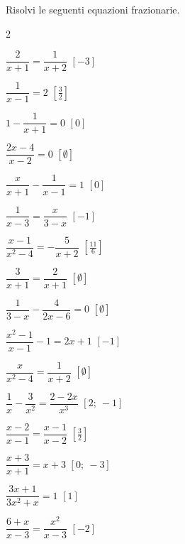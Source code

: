 \begin{esercizio}[*]
\label{ese:20.15}
Risolvi le seguenti equazioni frazionarie.
\begin{htmulticols}{2}
\begin{enumeratea}
 \item \(\dfrac{2}{x+1}=\dfrac{1}{x+2}\) \hfill \(\left[-3\right]\)
 \item \(\dfrac{1}{x-1}=2\) \hfill \(\left[\frac{3}{2}\right]\)
 \item \(1-\dfrac{1}{x+1}=0\) \hfill \(\left[0\right]\)
 \item \(\dfrac{2x-4}{x-2}=0\) \hfill \(\left[\emptyset\right]\)
 \item \(\dfrac{x}{x+1}-\dfrac{1}{x-1}=1\) \hfill \(\left[0\right]\)
 \item \(\dfrac{1}{x-3}=\dfrac{x}{3-x}\) \hfill \(\left[-1\right]\)
 \item \(\dfrac{x-1}{x^{2}-4}=-{\dfrac{5}{x+2}}\) 
  \hfill \(\left[\frac{11}{6}\right]\)
 \item \(\dfrac{3}{x+1}=\dfrac{2}{x+1}\) \hfill \(\left[\emptyset\right]\)
 \item \(\dfrac{1}{3-x}-\dfrac{4}{2x-6}=0\) \hfill \(\left[\emptyset\right]\)
 \item \(\dfrac{x^{2}-1}{x-1}-1=2x+1\) \hfill \(\left[-1\right]\)
 \item \(\dfrac{x}{x^{2}-4}=\dfrac{1}{x+2}\) \hfill \(\left[\emptyset\right]\)
 \item \(\dfrac{1}{x}-\dfrac{3}{x^{2}}=\dfrac{2-2x}{x^{3}}\) 
  \hfill \(\left[2;~-1\right]\)
 \item \(\dfrac{x-2}{x-1}=\dfrac{x-1}{x-2}\) \hfill \(\left[\frac{3}{2}\right]\)
 \item \(\dfrac{x+3}{x+1}=x+3\) \hfill \(\left[0;~-3\right]\)
 \item \(\dfrac{3x+1}{3x^{2}+x}=1\) \hfill \(\left[1\right]\)
 \item \(\dfrac{6+x}{x-3}=\dfrac{x^{2}}{x-3}\) \hfill \(\left[-2\right]\)
\end{enumeratea}
\end{htmulticols}
\end{esercizio}

